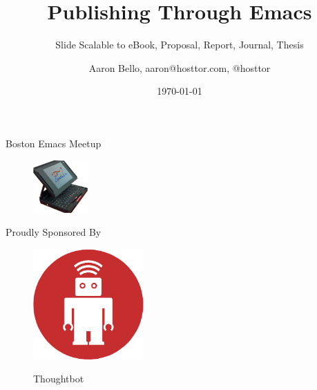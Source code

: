 \documentclass[english,12pt,presentation]{beamer}
\title{Publishing Through Emacs}
\subtitle{Slide Scalable to eBook, Proposal, Report, Journal, Thesis}
\author{Aaron Bello, aaron@hosttor.com, @hosttor}
\date{\today}
\begin{document}
\begin{frame}{Boston Emacs Meetup}
\begin{figure}
\centering
\includegraphics[width=80]{images/emachine.png}
\end{figure}
\titlepage
\end{frame}

\begin{frame}{Proudly Sponsored By}
\begin{figure}
\centering
\includegraphics[width=160]{images/thoughtbot.png}
\item Thoughtbot
\end{figure}
\end{frame}
\end{document}
